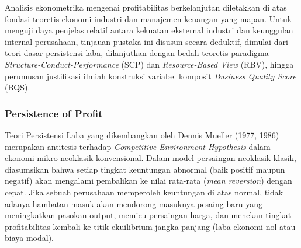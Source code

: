 \documentclass[12pt,a4paper]{article}
\begin{document}
Analisis ekonometrika mengenai profitabilitas berkelanjutan diletakkan
di atas fondasi teoretis ekonomi industri dan manajemen keuangan yang
mapan. Untuk menguji daya penjelas relatif antara kekuatan eksternal
industri dan keunggulan internal perusahaan, tinjauan pustaka ini
disusun secara deduktif, dimulai dari teori dasar persistensi laba,
dilanjutkan dengan bedah teoretis paradigma
\emph{Structure-Conduct-Performance} (SCP) dan \emph{Resource-Based
View} (RBV), hingga perumusan justifikasi ilmiah konstruksi variabel
komposit \emph{Business Quality Score} (BQS).

\subsubsection{Persistence of Profit}\label{persistence-of-profit}

Teori Persistensi Laba yang dikembangkan oleh Dennis Mueller (1977,
1986) merupakan antitesis terhadap \emph{Competitive Environment
Hypothesis} dalam ekonomi mikro neoklasik konvensional. Dalam model
persaingan neoklasik klasik, diasumsikan bahwa setiap tingkat keuntungan
abnormal (baik positif maupun negatif) akan mengalami pembalikan ke
nilai rata-rata (\emph{mean reversion}) dengan cepat. Jika sebuah
perusahaan memperoleh keuntungan di atas normal, tidak adanya hambatan
masuk akan mendorong masuknya pesaing baru yang meningkatkan pasokan
output, memicu persaingan harga, dan menekan tingkat profitabilitas
kembali ke titik ekuilibrium jangka panjang (laba ekonomi nol atau biaya
modal).
\end{document}
